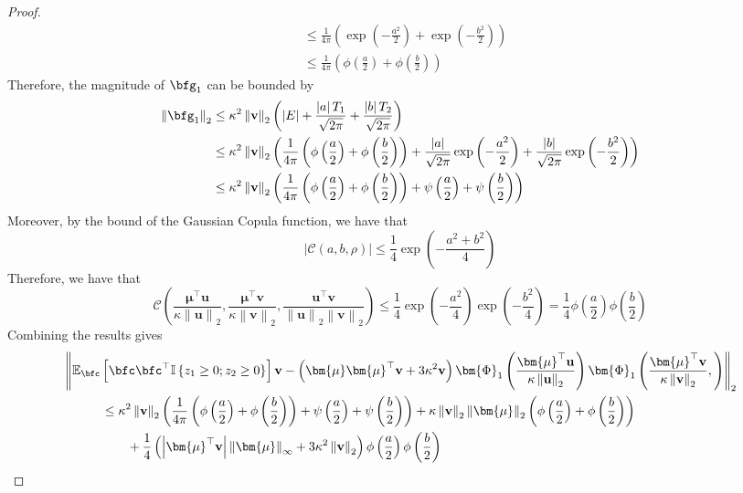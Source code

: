 \documentclass[10pt]{article} %
\theoremstyle{definition}
\theoremstyle{plain}
\newcommand{\paren}[1]{\left(#1\right)}
\newcommand{\norm}[1]{\left\|#1\right\|}
\newcommand{\indy}[1]{\mathbb{I}\left\{#1\right\}}
\providecommand{\E}{\mathbb{E}}
\def\bfu{{\mathbf{u}}}\def\bfv{{\mathbf{v}}}\def\bfw{{\mathbf{w}}}\def\bfx{{\mathbf{x}}}
\begin{document}
\begin{proof}
\begin{align*}
        & \leq \frac{1}{4\pi}\paren{\exp\paren{-\frac{a^2}{2}} + \exp\paren{-\frac{b^2}{2}}}\\
        & \leq  \frac{1}{4\pi}\paren{\phi\paren{\frac{a}{2}} + \phi\paren{\frac{b}{2}}}
    \end{align*}
    Therefore, the magnitude of $\bfg_1$ can be bounded by
    \begin{equation}
        \label{eq:g1_bound}
        \begin{aligned}
            \norm{\bfg_1}_2 & \leq \kappa^2\norm{\bfv}_2\paren{\left|E\right| + \frac{\left|a\right|T_1}{\sqrt{2\pi}} + \frac{\left|b\right|T_2}{\sqrt{2\pi}}}\\
            & \leq \kappa^2\norm{\bfv}_2\paren{\frac{1}{4\pi}\paren{\phi\paren{\frac{a}{2}} + \phi\paren{\frac{b}{2}}} + \frac{\left|a\right|}{\sqrt{2\pi}}\exp\paren{-\frac{a^2}{2}} + \frac{\left|b\right|}{\sqrt{2\pi}}\exp\paren{-\frac{b^2}{2}}}\\
            & \leq \kappa^2\norm{\bfv}_2\paren{\frac{1}{4\pi}\paren{\phi\paren{\frac{a}{2}} + \phi\paren{\frac{b}{2}}} + \psi\paren{\frac{a}{2}} + \psi\paren{\frac{b}{2}}}
        \end{aligned}
    \end{equation}
    Moreover, by the bound of the Gaussian Copula function, we have that
    \[
        \left|\mathcal{C}\paren{a,b,\rho}\right|\leq \frac{1}{4}\exp\paren{-\frac{a^2+b^2}{4}}
    \]
    Therefore, we have that
    \[
        \mathcal{C}\paren{\frac{\bm{\mu}^\top\bfu}{\kappa\norm{\bfu}_2}, \frac{\bm{\mu}^\top\bfv}{\kappa\norm{\bfv}_2}, \frac{\bfu^\top\bfv}{\norm{\bfu}_2\norm{\bfv}_2}} \leq \frac{1}{4}\exp\paren{-\frac{a^2}{4}}\exp\paren{-\frac{b^2}{4}} = \frac{1}{4}\phi\paren{\frac{a}{2}}\phi\paren{\frac{b}{2}}
    \]
    Combining the results gives
    \begin{align*}
        & \norm{\E_{\bfc}\left[\bfc\bfc^\top\indy{z_1\geq 0;z_2\geq 0}\right]\bfv - \paren{\bm{\mu}\bm{\mu}^\top\bfv + 3\kappa^2\bfv}\bm{\Phi}_1\paren{\frac{\bm{\mu}^\top\bfu}{\kappa\norm{\bfu}_2}}\bm{\Phi}_1\paren{\frac{\bm{\mu}^\top\bfv}{\kappa\norm{\bfv}_2},}}_2\\
        & \quad\quad\quad \leq \kappa^2\norm{\bfv}_2\paren{\frac{1}{4\pi}\paren{\phi\paren{\frac{a}{2}} + \phi\paren{\frac{b}{2}}} + \psi\paren{\frac{a}{2}} + \psi\paren{\frac{b}{2}}} + \kappa\norm{\bfv}_2\norm{\bm{\mu}}_2\paren{\phi\paren{\frac{a}{2}} + \phi\paren{\frac{b}{2}}}\\
        & \quad\quad\quad\quad\quad + \frac{1}{4}\paren{\left|\bm{\mu}^\top\bfv\right|\norm{\bm{\mu}}_{\infty} + 3\kappa^2\norm{\bfv}_2}\phi\paren{\frac{a}{2}}\phi\paren{\frac{b}{2}}\\

\end{align*}
\end{proof}
\end{document}
